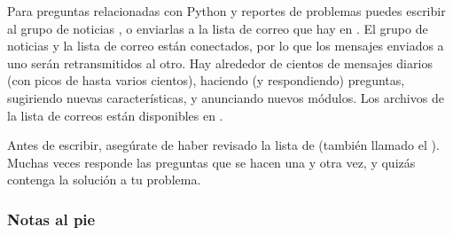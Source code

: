 \documentclass[a5paper,10pt,spanish]{sphinxmanual}
\begin{document}
\sphinxAtStartPar
Para preguntas relacionadas con Python y reportes de problemas puedes escribir al grupo de noticias , o enviarlas a la lista de correo que hay en . El grupo de noticias y la lista de correo están conectados, por lo que los mensajes enviados a uno serán retransmitidos al otro.  Hay alrededor de cientos de mensajes diarios (con picos de hasta varios cientos), haciendo (y respondiendo) preguntas, sugiriendo nuevas características, y anunciando nuevos módulos. Los archivos de la lista de correos están disponibles en .

\sphinxAtStartPar
Antes de escribir, asegúrate de haber revisado la lista de  (también llamado el ). Muchas veces responde las preguntas que se hacen una y otra vez, y quizás contenga la solución a tu problema.
\subsubsection*{Notas al pie}

\renewcommand{\indexname}{Índice}
\printindex
\end{document}
